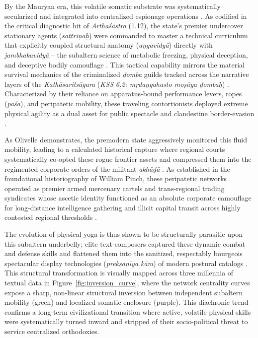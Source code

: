 \documentclass[11pt,twoside,letterpaper]{article}
\begin{document}
By the Mauryan era, this volatile somatic substrate was systematically secularized and integrated into centralized espionage operations \citep{mccartney2026}. As codified in the critical diagnostic hit of \textit{Arthaśāstra} (1.12), the state’s premier undercover stationary agents (\textit{sattriṇaḥ}) were commanded to master a technical curriculum that explicitly coupled structural anatomy (\textit{aṇgavidyā}) directly with \textit{jambhakavidyā} – the subaltern science of metabolic freezing, physical deception, and deceptive bodily camouflage \citep{mccartney2026}. This tactical capability mirrors the material survival mechanics of the criminalized \textit{ḍomba} guilds tracked across the narrative layers of the \textit{Kathāsaritsāgara} (\textit{KSS 6.2: mṛdaṇgahasto moṣāya ḍombaḥ}) \citep{mccartneyforthcomingB}. Characterized by their reliance on apparatus-bound performance levers, ropes (\textit{pāśa}), and peripatetic mobility, these traveling contortionists deployed extreme physical agility as a dual asset for public spectacle and clandestine border-evasion \citep{mccartney2026, mccartneyforthcomingB}.

As Olivelle demonstrates, the premodern state aggressively monitored this fluid mobility, leading to a calculated historical capture where regional courts systematically co-opted these rogue frontier assets and compressed them into the regimented corporate orders of the militant \textit{akhāḍā} \citep{Clark2006, Olivelle1987}. As established in the foundational historiography of William Pinch, these peripatetic networks operated as premier armed mercenary cartels and trans-regional trading syndicates whose ascetic identity functioned as an absolute corporate camouflage for long-distance intelligence gathering and illicit capital transit across highly contested regional thresholds \citep{Pinch1996, Pinch2012}. 

The evolution of physical yoga is thus shown to be structurally parasitic upon this subaltern underbelly; elite text-composers captured these dynamic combat and defense skills and flattened them into the sanitized, respectably bourgeois spectacular display technologies (\textit{prekṣaṇīya kām}) of modern postural catalogs \citep{Birch2024, Danta2015}. This structural transformation is visually mapped across three millennia of textual data in Figure~\ref{fig:inversion_curve}, where the network centrality curves expose a sharp, non-linear structural inversion between independent subaltern mobility (green) and localized somatic enclosure (purple). This diachronic trend confirms a long-term civilizational transition where active, volatile physical skills were systematically turned inward and stripped of their socio-political threat to service centralized orthodoxies.
 
\end{document}

